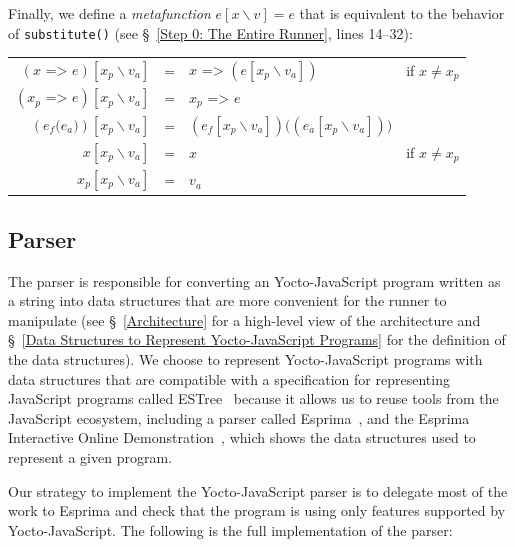 \documentclass[12pt, oneside]{book}
\begin{document}
\begin{mdframed}[frametitle = {Advanced}]
Finally, we define a \emph{metafunction} $e[x \backslash v] = e$ that is equivalent to the behavior of \texttt{substitute()} (see §~\ref{Step 0: The Entire Runner}, lines 14–32):

\begin{center}
\begin{tabular}{rcll}
$(x\texttt{ => }e)[x_{p} \backslash v_{a}]$ & = & $x\texttt{ => }(e[x_{p} \backslash v_{a}])$ & if $x \neq x_{p}$ \\
$(x_{p}\texttt{ => }e)[x_{p} \backslash v_{a}]$ & = & $x_{p}\texttt{ => }e$ & \\
$(e_{f}\texttt{(}e_{a}\texttt{)})[x_{p} \backslash v_{a}]$ & = & $(e_{f}[x_{p} \backslash v_{a}])\texttt{(}(e_{a}[x_{p} \backslash v_{a}])\texttt{)}$ & \\
$x[x_{p} \backslash v_{a}]$ & = & $x$ & if $x \neq x_{p}$ \\
$x_{p}[x_{p} \backslash v_{a}]$ & = & $v_{a}$ & \\
\end{tabular}
\end{center}
\end{mdframed}

\subsection{Parser}
\label{Parser}

The parser is responsible for converting an Yocto-JavaScript program written as a string into data structures that are more convenient for the runner to manipulate (see §~\ref{Architecture} for a high-level view of the architecture and §~\ref{Data Structures to Represent Yocto-JavaScript Programs} for the definition of the data structures). We choose to represent Yocto-JavaScript programs with data structures that are compatible with a specification for representing JavaScript programs called ESTree~\cite{estree, estree-types} because it allows us to reuse tools from the JavaScript ecosystem, including a parser called Esprima~\cite{esprima}, and the Esprima Interactive Online Demonstration~\cite{esprima-demonstration}, which shows the data structures used to represent a given program.

Our strategy to implement the Yocto-JavaScript parser is to delegate most of the work to Esprima and check that the program is using only features supported by Yocto-JavaScript. The following is the full implementation of the parser:
\end{document}
